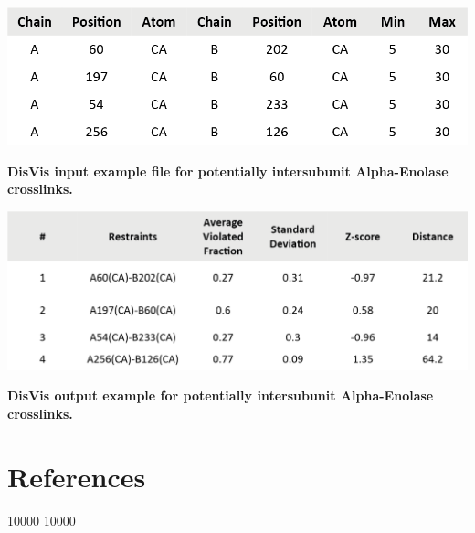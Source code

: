 \begin{subappendices}
  \begin{table}[!hbt]
    \includegraphics[]{Chapter.2/Figures/ts2.png}
    \captionsetup{singlelinecheck = false, format= hang}
    \caption{
      \textbf{DisVis input example file for potentially intersubunit Alpha-Enolase crosslinks.}
    }
    \label{tab:tabs2.2}
  \end{table}
  \vspace{1cm}
  \begin{table}[!hbt]
    \includegraphics[]{Chapter.2/Figures/ts3.png}
    \captionsetup{singlelinecheck = false, format= hang}
    \caption{
      \textbf{DisVis output example for potentially intersubunit Alpha-Enolase crosslinks.}
    }
    \label{tab:tabs2.3}
  \end{table}
\end{subappendices}

\clearpage
\section*{References}

\patchcmd{\thebibliography}
{}
{ 10000  10000}
{}{}

\stopthumb

